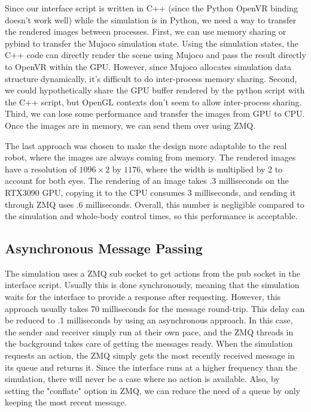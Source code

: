 Since our interface script is written in C++ (since the Python OpenVR binding doesn't work well) while the simulation is in Python, we need a way to transfer the rendered images between processes. 
First, we can use memory sharing or pybind to transfer the Mujoco simulation state. Using the simulation states, the C++ code can directly render the scene using Mujoco and pass the result directly to OpenVR within the GPU. However, since Mujoco allocates simulation data structure dynamically, it's difficult to do inter-process memory sharing. Second, we could hypothetically share the GPU buffer rendered by the python script with the C++ script, but OpenGL contexts don't seem to allow inter-process sharing. Third, we can lose some performance and transfer the images from GPU to CPU. Once the images are in memory, we can send them over using ZMQ. 

The last approach was chosen to make the design more adaptable to the real robot, where the images are always coming from memory. The rendered images have a resolution of $1096 \times 2$ by $1176$, where the width is multiplied by 2 to account for both eyes. The rendering of an image takes .3 milliseconds on the RTX3090 GPU, copying it to the CPU consumes 3 milliseconds, and sending it through ZMQ uses .6 milliseconds. Overall, this number is negligible compared to the simulation and whole-body control times, so this performance is acceptable. 

\subsection{Asynchronous Message Passing}

The simulation uses a ZMQ sub socket to get actions from the pub socket in the interface script. Usually this is done synchronously, meaning that the simulation waits for the interface to provide a response after requesting. However, this approach usually takes 70 milliseconds for the message round-trip. This delay can be reduced to .1 milliseconds by using an asynchronous approach. In this case, the sender and receiver simply run at their own pace, and the ZMQ threads in the background takes care of getting the messages ready. When the simulation requests an action, the ZMQ simply gets the most recently received message in its queue and returns it. Since the interface runs at a higher frequency than the simulation, there will never be a case where no action is available. Also, by setting the "conflate" option in ZMQ, we can reduce the need of a queue by only keeping the most recent message. 

